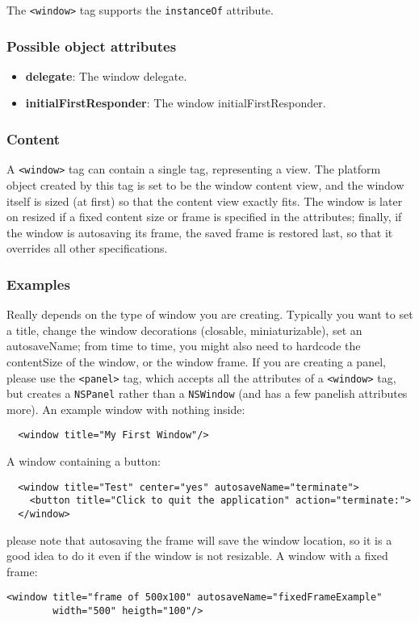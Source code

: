 The \texttt{<window>} tag supports the \texttt{instanceOf} attribute.

\subsubsection{Possible object attributes}
\begin{itemize}
\item {\bf delegate}: The window delegate.
\item {\bf initialFirstResponder}: The window initialFirstResponder.
\end{itemize}

\subsubsection{Content}
A \texttt{<window>} tag can contain a single tag, representing a view.
The platform object created by this tag is set to be the window
content view, and the window itself is sized (at first) so that the
content view exactly fits.  The window is later on resized if a fixed
content size or frame is specified in the attributes; finally, if the
window is autosaving its frame, the saved frame is restored last, so
that it overrides all other specifications.

\subsubsection{Examples}
Really depends on the type of window you are creating.  Typically you
want to set a title, change the window decorations (closable,
miniaturizable), set an autosaveName; from time to time, you might
also need to hardcode the contentSize of the window, or the window
frame.  If you are creating a panel, please use the \texttt{<panel>}
tag, which accepts all the attributes of a \texttt{<window>} tag, but
creates a \texttt{NSPanel} rather than a \texttt{NSWindow} (and has a
few panelish attributes more).  An example window with nothing inside:
\begin{verbatim}
  <window title="My First Window"/>
\end{verbatim}
A window containing a button:
\begin{verbatim}
  <window title="Test" center="yes" autosaveName="terminate">
    <button title="Click to quit the application" action="terminate:">
  </window>
\end{verbatim}
please note that autosaving the frame will save the window location,
so it is a good idea to do it even if the window is not resizable.  A
window with a fixed frame:
\begin{verbatim}
<window title="frame of 500x100" autosaveName="fixedFrameExample"
        width="500" heigth="100"/>
\end{verbatim}


